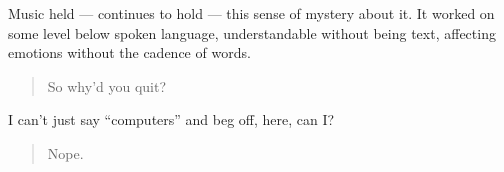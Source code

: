 Music held --- continues to hold --- this sense of mystery about it. It worked on some level below spoken language, understandable without being text, affecting emotions without the cadence of words.

\begin{quote}
So why'd you quit?
\end{quote}

I can't just say ``computers'' and beg off, here, can I?

\begin{quote}
Nope.
\end{quote}
